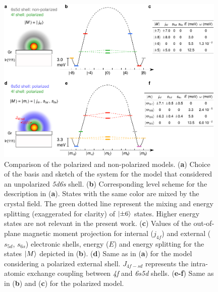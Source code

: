\documentclass[
reprint,amsmath,amssymb,aps]{revtex4-2}
\begin{document}
\begin{figure}[ht!]
\includegraphics[width=0.98\textwidth]{Fig1_new.pdf}
\caption{Comparison of the polarized and non-polarized models. (\textbf{a}) Choice of the basis and sketch of the system for the model that considered an unpolarized \textit{5d6s} shell. (\textbf{b}) Corresponding level scheme for the description in (\textbf{a}). States with the same color are mixed by the crystal field. The green dotted line represent the mixing and energy splitting (exaggerated for clarity) of $\ket{\pm6}$ states. Higher energy states are not relevant in the present work.  (\textbf{c}) Values of the out-of-plane magnetic moment projection for internal ($j_{4f}$) and external ($s_{5d}$, $s_{6s}$)  electronic shells, energy ($E$) and energy splitting for the states $\ket{M}$ depicted in (\textbf{b}). (\textbf{d}) Same as in (\textbf{a}) for the model considering a polarized external shell. $J_{4f-sd}$ represents the intra-atomic exchange coupling between \textit{4f} and \textit{6s5d} shells. (\textbf{e-f}) Same as in (\textbf{b}) and (\textbf{c}) for the polarized model. 
\label{fig:intra} }
\end{figure}
\end{document}
